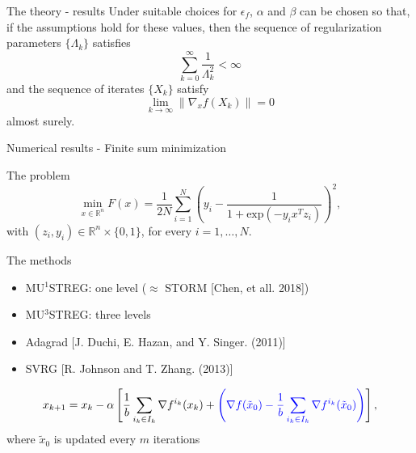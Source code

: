 \documentclass{beamer}
\begin{document}
	

	
	
		
	

	
\begin{frame}{The theory - results}
  Under suitable choices for           $\epsilon_f$,
     $\alpha$ and $\beta$ can be chosen so that, if the assumptions hold for these values, then the sequence of regularization parameters $\{\Lambda_k\}$ satisfies
     $$
\sum_{k=0}^{\infty}\frac{1}{\Lambda_k^2}<\infty
     $$
     and the sequence of iterates  $\{X_k\}$ satisfy
$$
\lim_{k\rightarrow\infty}\|\nabla_x f(X_k)\|=0
$$
     almost surely.
\end{frame}

\begin{frame}{Numerical results - Finite sum minimization}
\begin{block}{The problem}
\begin{equation*}
    \min_{x \in  \mathbb{R}^n}  F(x) =  \frac{1}{2N}\sum_{i=1}^N (y_i - \frac{1}{1 + \text{exp}(-y_ix^Tz_i)})^2,
\end{equation*}
with $(z_i,y_i)\in \mathbb{R}^n \times \{0,1\}$, for every $i=1,\dots,N$. 
\end{block}
\vspace{0.3cm}
\begin{block}{The methods}
\begin{itemize}
\item MU$^1$STREG: one level ($\approx$ STORM [Chen, et all. 2018])
\item MU$^3$STREG: three levels
\item Adagrad [J. Duchi, E. Hazan, and Y. Singer. (2011)]
\item SVRG [R. Johnson and T. Zhang. (2013)]
\end{itemize}
$$x_{k+1}=x_k-\alpha\left[\frac{1}{b}\sum_{i_k\in I_k}\nabla f^{i_k}(x_k) +\textcolor{blue}{ \left(\nabla f(\tilde{x}_0)-\frac{1}{b}\sum_{i_k\in I_k}\nabla f^{i_k}(\tilde{x}_0)\right)}\right],$$ 
where $\tilde{x}_0$ is updated every $m$ iterations 
\end{block}
	\end{frame}
\end{document}
